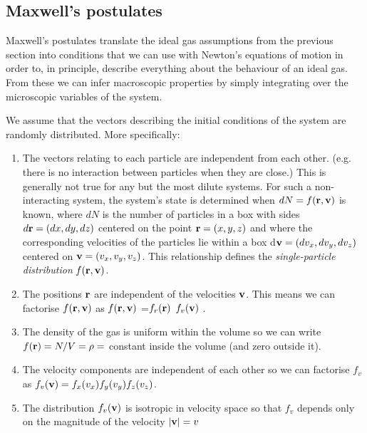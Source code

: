 \subsection{Maxwell's postulates}
Maxwell's postulates translate the ideal gas assumptions from the previous section into conditions that we can use with Newton's equations of motion in order to, in principle, describe everything about the behaviour of an ideal gas. From these we can infer macroscopic properties by simply integrating over the microscopic variables of the system.

We assume that the vectors describing the initial conditions of the system are randomly distributed. More specifically:
\begin{enumerate}
\item The vectors relating to each particle are independent from each other. (e.g. there is no interaction between particles when they are close.) This is generally not true for any but the most dilute systems. For such a non-interacting system, the system's state is determined when $dN=f({\bf r},{\bf v})$ is known, where $dN$ is the number of particles in a box with sides $d{\bf r}=(dx,dy,dz)$ centered on the point ${\bf r} = (x,y,z)$ and where the corresponding velocities of the particles lie within a box d${\bf v}=(dv_x,dv_y,dv_z)$ centered on ${\bf v}=(v_x,v_y,v_z)$. This relationship defines the \emph{single-particle distribution} $f({\bf r},{\bf v})$.
\item The positions ${\bf r}$ are independent of the velocities ${\bf v}$. This means we can factorise $f({\bf r},{\bf v})$ as $f({\bf r},{\bf v})$ =$f_r({\bf r})$ $f_v({\bf v})$ .
\item The density of the gas is uniform within the volume so we can write $f({\bf r}) = N/V=\rho=$ constant inside the volume (and zero outside it).
\item The velocity components are independent of each other so we can factorise $f_v$ as $f_v({\bf v})=f_x(v_x)f_y(v_y)f_z(v_z)$.
\item The distribution $f_v({\bf v})$ is isotropic in velocity space so that $f_v$ depends only on the magnitude of the velocity $|{\bf v}| = v$
\end{enumerate}

